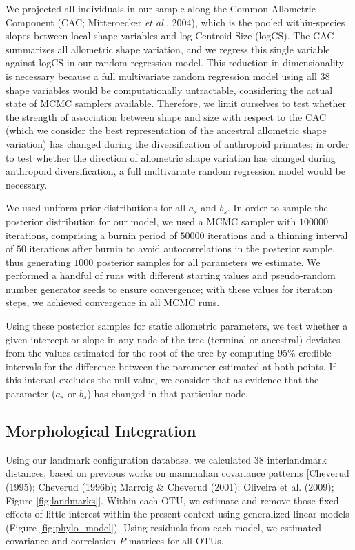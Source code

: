 \documentclass[12pt,]{article}
\begin{document}
We projected all individuals in our sample along the Common Allometric
Component (CAC; Mitteroecker \emph{et al.}, 2004), which is the pooled
within-species slopes between local shape variables and log Centroid
Size (logCS). The CAC summarizes all allometric shape variation, and we
regress this single variable against logCS in our random regression
model. This reduction in dimensionality is necessary because a full
multivariate random regression model using all 38 shape variables would
be computationally untractable, considering the actual state of MCMC
samplers available. Therefore, we limit ourselves to test whether the
strength of association between shape and size with respect to the CAC
(which we consider the best representation of the ancestral allometric
shape variation) has changed during the diversification of anthropoid
primates; in order to test whether the direction of allometric shape
variation has changed during anthropoid diversification, a full
multivariate random regression model would be necessary.

We used uniform prior distributions for all $a_s$ and $b_s$. In order to
sample the posterior distribution for our model, we used a MCMC sampler
with $100000$ iterations, comprising a burnin period of $50000$
iterations and a thinning interval of $50$ iterations after burnin to
avoid autocorrelations in the posterior sample, thus generating $1000$
posterior samples for all parameters we estimate. We performed a handful
of runs with different starting values and pseudo-random number
generator seeds to ensure convergence; with these values for iteration
steps, we achieved convergence in all MCMC runs.

Using these posterior samples for static allometric parameters, we test
whether a given intercept or slope in any node of the tree (terminal or
ancestral) deviates from the values estimated for the root of the tree
by computing 95\% credible intervals for the difference between the
parameter estimated at both points. If this interval excludes the null
value, we consider that as evidence that the parameter ($a_s$ or $b_s$)
has changed in that particular node.

\subsection{Morphological Integration}\label{morphological-integration}

Using our landmark configuration database, we calculated 38
interlandmark distances, based on previous works on mammalian covariance
patterns {[}Cheverud (1995); Cheverud (1996b); Marroig \& Cheverud
(2001); Oliveira et al. (2009); Figure \ref{fig:landmarks}{]}. Within
each OTU, we estimate and remove those fixed effects of little interest
within the present context using generalized linear models (Figure
\ref{fig:phylo_model}). Using residuals from each model, we estimated
covariance and correlation $P$-matrices for all OTUs.
\end{document}
